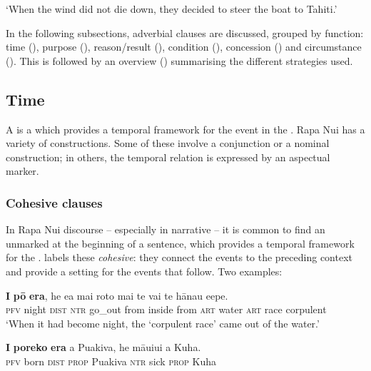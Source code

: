 \glt
‘When the wind did not die down, they decided to steer the boat to Tahiti.’ \textstyleExampleref{[R303.064]} 
\z

In the following subsections, adverbial clauses are discussed, grouped by function: time (), purpose (), reason/result (), condition (), concession () and circumstance (). This is followed by an overview () summarising the different strategies used.

\subsection{Time}\label{sec:11.6.2}
A  is a  which provides a temporal framework for the event in the . Rapa Nui has a variety of  constructions. Some of these involve a conjunction or a nominal construction; in others, the temporal relation is expressed by an aspectual marker.

\subsubsection[Cohesive clauses]{Cohesive clauses}\label{sec:11.6.2.1}
In Rapa Nui discourse – especially in narrative – it is common to find an unmarked  at the beginning of a sentence, which provides a temporal framework for the . \citet[116]{WeberR2003} labels these \textit{cohesive}: they connect the events to the preceding context and provide a setting for the events that follow. Two examples: 

\ea\label{ex:11.211}
\gll \textbf{I} \textbf{pō} \textbf{era}, he e{\ꞌ}a mai roto mai te vai te hānau {\ꞌ}e{\ꞌ}epe. \\
\textsc{pfv} night \textsc{dist} \textsc{ntr} go\_out from inside from \textsc{art} water \textsc{art} race corpulent \\

\glt 
‘When it had become night, the ‘corpulent race’ came out of the water.’ \textstyleExampleref{[Ley-3-06.046]}
\z

\ea\label{ex:11.212}
\gll \textbf{I} \textbf{poreko} \textbf{era} a Puakiva, he māuiui a Kuha. \\
\textsc{pfv} born \textsc{dist} \textsc{prop} Puakiva \textsc{ntr} sick \textsc{prop} Kuha \\

